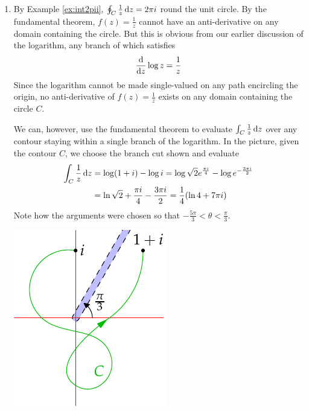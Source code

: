 \begin{examples}{}{}
\begin{enumerate}
  \item By Example \ref{ex:int2pii}, $\oint_C\frac 1z\,{\mathrm{d} z}=2\pi i$ round the unit circle. By the fundamental theorem, $f(z)=\frac 1z$ cannot have an anti-derivative on any domain containing the circle. But this is obvious from our earlier discussion of the logarithm, any branch of which satisfies
\[\frac{\mathrm{d} }{\mathrm{d} z}\log z=\frac 1z\]
Since the logarithm cannot be made single-valued on any path encircling the origin, no anti-derivative of $f(z)=\frac 1z$ exists on any domain containing the circle $C$.\par
\begin{minipage}[t]{0.7\linewidth}\vspace{-10pt}
We can, however, use the fundamental theorem to evaluate $\int_C\frac 1z\,{\mathrm{d} z}$ over any contour staying within a single branch of the logarithm. In the picture, given the contour $C$, we choose the branch cut shown and evaluate
\begin{align*}
\int_C\frac 1z\,{\mathrm{d} z}&=\log(1+i)-\log i =\log\sqrt 2e^{\frac{\pi i}{4}}-\log e^{-\frac{3\pi i}{2}}\\
&=\ln\sqrt 2+\frac{\pi i}4-\frac{3\pi i}2=\frac 14(\ln 4+7\pi i)
\end{align*}
Note how the arguments were chosen so that $-\frac{5\pi}3<\theta<\frac\pi 3$.
\end{minipage}\begin{minipage}[t]{0.3\linewidth}\vspace{-20pt}
\flushright\includegraphics{contour-branch}
\end{minipage}
\end{enumerate}

\end{examples}

\vfill


